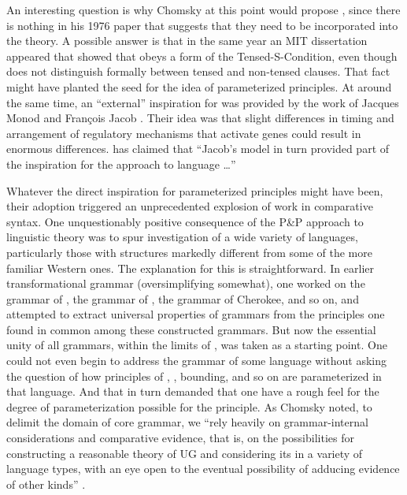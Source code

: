 \documentclass[output=paper,
modfonts
]{LSP/langsci}
\begin{document}
An interesting question is why Chomsky at this point would propose
, since there is nothing in his 1976 paper that suggests that
they need to be incorporated into the theory. A possible answer is that
in the same year an MIT dissertation appeared \citep{kim1976} that showed
that  obeys a form of the Tensed-S-Condition, even though 
does not distinguish formally between tensed and non-tensed clauses.
That fact might have planted the seed for the idea of parameterized
principles. At around the same time, an ``external'' inspiration for
 was provided by the work of Jacques Monod and François Jacob
\citep{monod1972,jacob1977}. Their idea was that slight differences in
timing and arrangement of regulatory mechanisms that activate genes
could result in enormous differences.  \citet[28]{berwick2011n}
has claimed that ``Jacob's model in turn provided part of the
inspiration for the  approach to
language \ldots{}''

Whatever the direct inspiration for parameterized principles might have
been, their adoption triggered an unprecedented explosion of work in
comparative syntax. One unquestionably positive consequence of the P\&P
approach to linguistic theory was to spur investigation of a wide
variety of languages, particularly those with structures markedly
different from some of the more familiar Western ones. The explanation
for this is straightforward. In earlier transformational grammar
(oversimplifying somewhat), one worked on the grammar of , the
grammar of , the grammar of Cherokee, and so on, and attempted to
extract universal properties of grammars from the principles one found
in common among these constructed grammars. But now the essential unity
of all grammars, within the limits of , was taken as
a starting point. One could not even begin to address the grammar
of some language without asking the question of how principles of ,
, bounding, and so on are parameterized in that language. And
that in turn demanded that one have a rough feel for the degree of
parameterization possible for the principle. As Chomsky noted, to
delimit the domain of core grammar, we ``rely heavily on grammar-internal
considerations and comparative evidence, that is, on the possibilities
for constructing a reasonable theory of UG and considering its
 in a variety of language types, with an eye open to
the eventual possibility of adducing evidence of other kinds'' \citep[9]{chomsky1981}.
\end{document}

